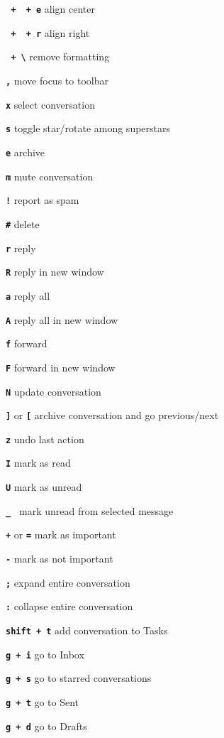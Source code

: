 \documentclass[11pt,letterpaper]{article}
\newcommand{\sck}[1]{\textbf{\texttt{#1}}}
\newcommand{\hdr}[1]{\vspace{1em}{\sffamily\bf \large #1}\vspace{0.5em}}
\begin{document}
\sck{\cmd\ + \shift\  + e} \dotfill align center

\sck{\cmd\ + \shift\  + r} \dotfill align right

\sck{\cmd\ + \textbackslash } \dotfill remove formatting

\hdr{Actions}

\sck{,} \dotfill move focus to toolbar

\sck{x} \dotfill select conversation

\sck{s} \dotfill toggle star/rotate among superstars

\sck{e} \dotfill archive

\sck{m} \dotfill mute conversation

\sck{!} \dotfill report as spam

\sck{\#} \dotfill delete

\sck{r} \dotfill reply

\sck{R} \dotfill reply in new window

\sck{a} \dotfill reply all

\sck{A} \dotfill reply all in new window

\sck{f} \dotfill forward

\sck{F} \dotfill forward in new window

\sck{N} \dotfill update conversation

\sck{]} or \sck{[} \dotfill archive conversation and go previous/next

\sck{z} \dotfill undo last action

\sck{I} \dotfill mark as read

\sck{U} \dotfill mark as unread

\sck{\_ } \dotfill mark unread from selected message

\sck{+} or \sck{=} \dotfill mark as important

\sck{-} \dotfill mark as not important

\sck{;} \dotfill expand entire conversation

\sck{:} \dotfill collapse entire conversation

\sck{shift + t} \dotfill add conversation to Tasks

\hdr{Jumping}

\sck{g + i} \dotfill go to Inbox	

\sck{g + s} \dotfill go to starred conversations	

\sck{g + t} \dotfill go to Sent	

\sck{g + d} \dotfill go to Drafts	
\end{document}
